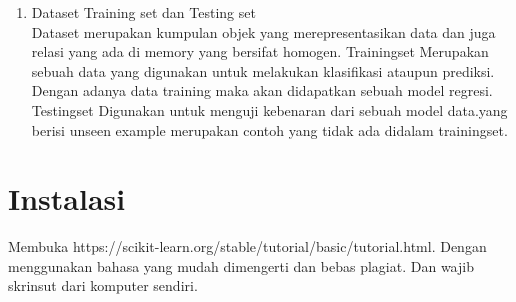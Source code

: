 \begin{enumerate}
\item
Dataset Training set dan Testing set\\
Dataset merupakan kumpulan objek yang merepresentasikan data dan juga relasi yang ada di memory yang bersifat homogen. Trainingset Merupakan sebuah data yang digunakan untuk melakukan klasifikasi ataupun prediksi. Dengan adanya data training maka akan didapatkan sebuah model regresi. Testingset Digunakan untuk menguji kebenaran dari sebuah model data.yang berisi unseen example merupakan contoh yang tidak ada didalam trainingset.
\end{enumerate}

\section{Instalasi}
Membuka https://scikit-learn.org/stable/tutorial/basic/tutorial.html. Dengan menggunakan bahasa yang mudah dimengerti dan bebas plagiat. 
Dan wajib skrinsut dari komputer sendiri.
